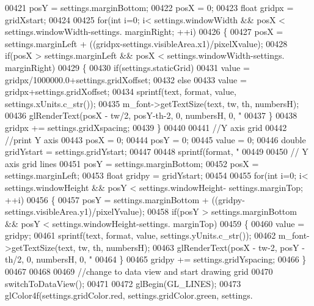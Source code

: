 \begin{DoxyCode}
{{{{00421     posY = settings.marginBottom;
00422     posX = 0;
00423     \textcolor{keywordtype}{float} gridpx = gridXstart;
00424 
00425     \textcolor{keywordflow}{for}(\textcolor{keywordtype}{int} i=0; i< settings.windowWidth && posX < settings.windowWidth-settings.
      marginRight; ++i)
00426     \{
00427         posX = settings.marginLeft + ((gridpx-settings.visibleArea.x1)/pixelXvalue);
00428         \textcolor{keywordflow}{if}(posX > settings.marginLeft && posX < settings.windowWidth-settings.
      marginRight)
00429         \{
00430             \textcolor{keywordflow}{if}(settings.staticGrid)
00431                 value = gridpx/1000000.0+settings.gridXoffset;
00432             \textcolor{keywordflow}{else}
00433                 value = gridpx+settings.gridXoffset;
00434             sprintf(text, format, value, settings.xUnits.c\_str());
00435             m_font->getTextSize(text, tw, th, numbersH);
00436             glRenderText(posX - tw/2, posY-th-2, 0, numbersH, 0, \textcolor{stringliteral}{"%
00437         \}
00438         gridpx += settings.gridXspacing;
00439     \}
00440 
00441     \textcolor{comment}{//Y axis grid}
00442     \textcolor{comment}{//print Y axis}
00443     posX = 0;
00444     posY = 0;
00445     value = 0;
00446     \textcolor{keywordtype}{double} gridYstart = settings.gridYstart;
00447 
00448     sprintf(format, \textcolor{stringliteral}{"%
00449 
00450     \textcolor{comment}{// Y axis grid lines}
00451     posY = settings.marginBottom;
00452     posX = settings.marginLeft;
00453     \textcolor{keywordtype}{float} gridpy = gridYstart;
00454 
00455     \textcolor{keywordflow}{for}(\textcolor{keywordtype}{int} i=0; i< settings.windowHeight && posY < settings.windowHeight-
      settings.marginTop; ++i)
00456     \{
00457         posY = settings.marginBottom + ((gridpy-settings.visibleArea.y1)/pixelYvalue);
00458         \textcolor{keywordflow}{if}(posY > settings.marginBottom && posY < settings.windowHeight-settings.
      marginTop)
00459         \{
00460             value = gridpy;
00461             sprintf(text, format, value, settings.yUnits.c\_str());
00462             m_font->getTextSize(text, tw, th, numbersH);
00463             glRenderText(posX - tw-2, posY - th/2, 0, numbersH, 0, \textcolor{stringliteral}{"%
00464         \}
00465         gridpy += settings.gridYspacing;
00466     \}
00467 
00468 
00469     \textcolor{comment}{//change to data view and start drawing grid}
00470     switchToDataView();
00471 
00472     glBegin(GL_LINES);
00473     glColor4f(settings.gridColor.red, settings.gridColor.green, settings.
}}}}}}}
\end{DoxyCode}
